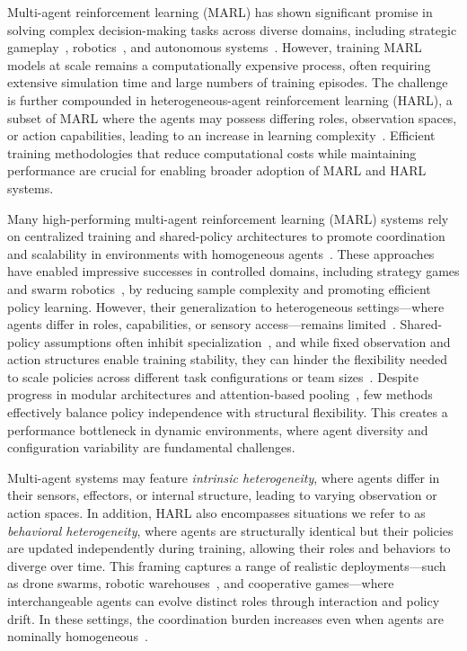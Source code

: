 \documentclass{article}
\begin{document}
Multi-agent reinforcement learning (MARL) has shown significant promise in solving complex 
decision-making tasks across diverse domains, including 
strategic gameplay~\cite{silver2016, vinyals2019, berner2019}, 
robotics~\cite{rizk2019, liang2024}, 
and autonomous systems~\cite{abeywickrama2022}. 
However, training MARL models at scale remains a computationally expensive process, 
often requiring extensive simulation time and large numbers of training episodes. 
The challenge is further compounded in heterogeneous-agent reinforcement learning (HARL), 
a subset of MARL where the agents may possess differing roles, observation spaces, 
or action capabilities, leading to an increase in learning complexity~\cite{rizk2019, yang2021a}.
Efficient training methodologies that reduce computational costs while maintaining 
performance are crucial for enabling broader adoption of MARL and HARL systems.

Many high-performing multi-agent reinforcement learning (MARL) systems rely on 
centralized training and shared-policy architectures to promote coordination and scalability 
in environments with homogeneous agents~\cite{ackermann2019,zhou2023}.
These approaches have enabled impressive successes in controlled domains, 
including strategy games and swarm robotics~\cite{vinyals2019, hoang2023}, 
by reducing sample complexity and promoting efficient policy learning. However, their 
generalization to heterogeneous settings—where agents differ in roles, capabilities, or 
sensory access—remains limited~\cite{zhong2024}. 
Shared-policy assumptions often inhibit specialization~\cite{smit2023}, 
and while fixed observation and action structures enable training stability, 
they can hinder the flexibility needed to scale policies across different 
task configurations or team sizes~\cite{papoudakis2021}. Despite progress 
in modular architectures and attention-based pooling~\cite{iqbal2021, foerster2017}, 
few methods effectively balance policy independence with structural flexibility. 
This creates a performance bottleneck in dynamic environments, where agent diversity and 
configuration variability are fundamental challenges.

Multi-agent systems may feature \emph{intrinsic heterogeneity}, 
where agents differ in their sensors, effectors, or internal structure, 
leading to varying observation or action spaces. In addition, 
HARL also encompasses situations we refer to as \emph{behavioral heterogeneity}, 
where agents are structurally identical but their policies are updated independently 
during training, allowing their roles and behaviors to diverge over time. 
This framing captures a range of realistic deployments—such as drone swarms, 
robotic warehouses~\cite{rizk2019}, and cooperative games—where interchangeable 
agents can evolve distinct roles through interaction and policy drift. 
In these settings, the coordination burden increases even when agents are 
nominally homogeneous~\cite{shoham2007,ackermann2019}.
\end{document}
